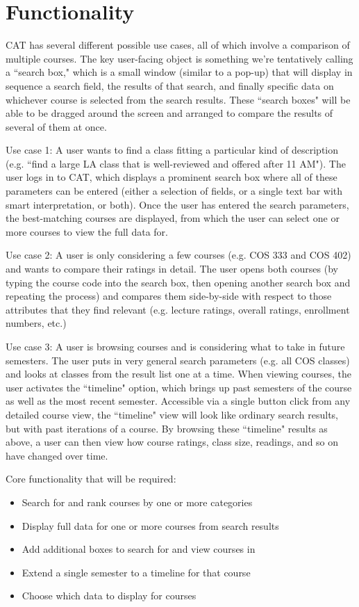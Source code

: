 \documentclass[11pt]{article}
\begin{document}
\section{Functionality}
CAT has several different possible use cases, all of which involve a comparison of multiple courses. The key user-facing object is something we're tentatively calling a ``search box," which is a small window (similar to a pop-up) that will display in sequence a search field, the results of that search, and finally specific data on whichever course is selected from the search results. These ``search boxes" will be able to be dragged around the screen and arranged to compare the results of several of them at once.
\par Use case 1: A user wants to find a class fitting a particular kind of description (e.g. ``find a large LA class that is well-reviewed and offered after 11 AM"). The user logs in to CAT, which displays a prominent search box where all of these parameters can be entered (either a selection of fields, or a single text bar with smart interpretation, or both). Once the user has entered the search parameters, the best-matching courses are displayed, from which the user can select one or more courses to view the full data for.
\par Use case 2: A user is only considering a few courses (e.g. COS 333 and COS 402) and wants to compare their ratings in detail. The user opens both courses (by typing the course code into the search box, then opening another search box and repeating the process) and compares them side-by-side with respect to those attributes that they find relevant (e.g. lecture ratings, overall ratings, enrollment numbers, etc.)
\par Use case 3: A user is browsing courses and is considering what to take in future semesters. The user puts in very general search parameters (e.g. all COS classes) and looks at classes from the result list one at a time. When viewing courses, the user activates the ``timeline" option, which brings up past semesters of the course as well as the most recent semester. Accessible via a single button click from any detailed course view, the ``timeline" view will look like ordinary search results, but with past iterations of a course. By browsing these ``timeline" results as above, a user can then view how course ratings, class size, readings, and so on have changed over time.

\par Core functionality that will be required:
\begin{itemize}
\item Search for and rank courses by one or more categories
\item Display full data for one or more courses from search results
\item Add additional boxes to search for and view courses in
\item Extend a single semester to a timeline for that course
\item Choose which data to display for courses
\end{itemize}
\end{document}
